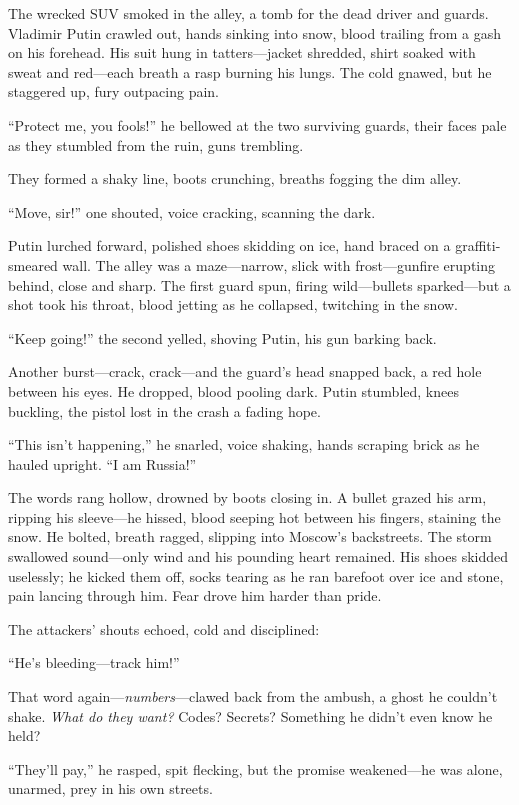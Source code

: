\documentclass[12pt]{book}
\begin{document}
The wrecked SUV smoked in the alley, a tomb for the dead driver and guards. Vladimir Putin crawled out, hands sinking into snow, blood trailing from a gash on his forehead. His suit hung in tatters---jacket shredded, shirt soaked with sweat and red---each breath a rasp burning his lungs. The cold gnawed, but he staggered up, fury outpacing pain.

\enquote{Protect me, you fools!} he bellowed at the two surviving guards, their faces pale as they stumbled from the ruin, guns trembling.

They formed a shaky line, boots crunching, breaths fogging the dim alley.

\enquote{Move, sir!} one shouted, voice cracking, scanning the dark.

Putin lurched forward, polished shoes skidding on ice, hand braced on a graffiti-smeared wall. The alley was a maze---narrow, slick with frost---gunfire erupting behind, close and sharp. The first guard spun, firing wild---bullets sparked---but a shot took his throat, blood jetting as he collapsed, twitching in the snow.

\enquote{Keep going!} the second yelled, shoving Putin, his gun barking back.

Another burst---crack, crack---and the guard’s head snapped back, a red hole between his eyes. He dropped, blood pooling dark. Putin stumbled, knees buckling, the pistol lost in the crash a fading hope.

\enquote{This isn’t happening,} he snarled, voice shaking, hands scraping brick as he hauled upright. \enquote{I am Russia!}

The words rang hollow, drowned by boots closing in. A bullet grazed his arm, ripping his sleeve---he hissed, blood seeping hot between his fingers, staining the snow. He bolted, breath ragged, slipping into Moscow’s backstreets. The storm swallowed sound---only wind and his pounding heart remained. His shoes skidded uselessly; he kicked them off, socks tearing as he ran barefoot over ice and stone, pain lancing through him. Fear drove him harder than pride.

The attackers’ shouts echoed, cold and disciplined:

\enquote{He’s bleeding---track him!}

That word again---\textit{numbers}---clawed back from the ambush, a ghost he couldn’t shake. \textit{What do they want?} Codes? Secrets? Something he didn’t even know he held?

\enquote{They’ll pay,} he rasped, spit flecking, but the promise weakened---he was alone, unarmed, prey in his own streets.
\end{document}

